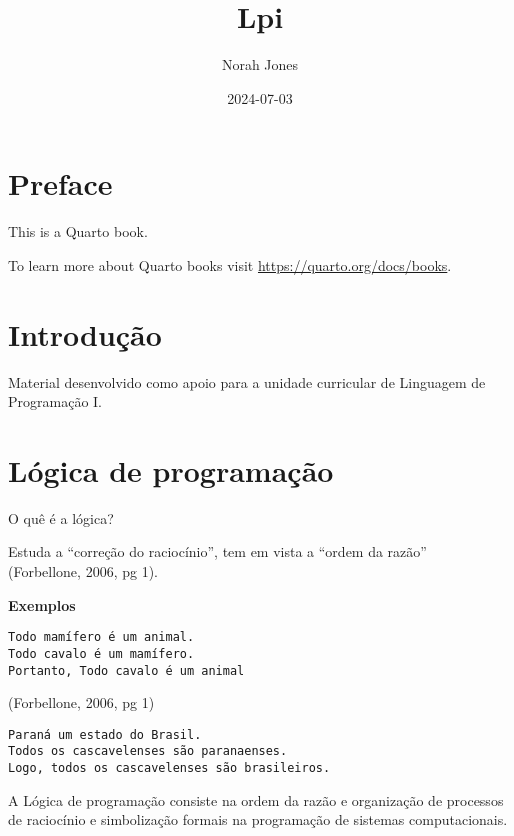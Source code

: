 \documentclass[
  letterpaper,
  DIV=11,
  numbers=noendperiod]{scrreprt}
\title{Lpi}
\author{Norah Jones}
\date{2024-07-03}
\renewcommand*\contentsname{Table of contents}
\newcommand\contentsname{Table of contents}
\begin{document}
\maketitle

\renewcommand*\contentsname{Table of contents}
{
\hypersetup{linkcolor=}
\setcounter{tocdepth}{2}
\tableofcontents
}

\chapter*{Preface}\label{preface}


This is a Quarto book.

To learn more about Quarto books visit
\url{https://quarto.org/docs/books}.


\chapter{Introdução}\label{introduuxe7uxe3o}

Material desenvolvido como apoio para a unidade curricular de Linguagem
de Programação I.


\chapter{Lógica de programação}\label{luxf3gica-de-programauxe7uxe3o}

O quê é a lógica?

Estuda a ``correção do raciocínio'', tem em vista a ``ordem da razão''\\
(Forbellone, 2006, pg 1).

\textbf{Exemplos}

\begin{verbatim}
Todo mamífero é um animal.
Todo cavalo é um mamífero.
Portanto, Todo cavalo é um animal
\end{verbatim}

(Forbellone, 2006, pg 1)

\begin{verbatim}
Paraná um estado do Brasil.
Todos os cascavelenses são paranaenses.
Logo, todos os cascavelenses são brasileiros.
\end{verbatim}

A Lógica de programação consiste na ordem da razão e organização de
processos de raciocínio e simbolização formais na programação de
sistemas computacionais.
\end{document}
